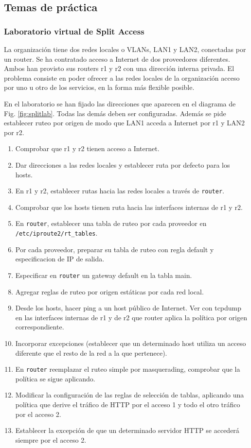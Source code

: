 \subsection{Temas de práctica}
\subsubsection{Laboratorio virtual de Split Access}
La organización tiene dos redes locales o VLANs, LAN1 y LAN2, conectadas por un router. Se ha contratado acceso a Internet de dos proveedores diferentes. Ambos han provisto sus routers r1 y r2 con una dirección interna privada. El problema consiste en poder ofrecer a las redes locales de la organización acceso por uno u otro de los servicios, en la forma más flexible posible. 


En el laboratorio se han fijado las direcciones que aparecen en el diagrama de Fig. \ref{fig:splitlab}. Todas las demás deben ser configuradas. Además se pide establecer ruteo por origen de modo que LAN1 acceda a Internet por r1 y LAN2 por r2.
\begin{enumerate}
	\item Comprobar que r1 y r2 tienen acceso a Internet. 
	\item Dar direcciones a las redes locales y establecer ruta por defecto para los hosts. 
	\item En r1 y r2, establecer rutas hacia las redes locales a través de \texttt{router}. 
	\item Comprobar que los hosts tienen ruta hacia las interfaces internas de r1 y r2. 
	\item En \texttt{router}, establecer una tabla de ruteo por cada proveedor en \texttt{/etc/iproute2/rt\_tables}. 
	\item Por cada proveedor, preparar su tabla de ruteo con regla default y especificacion de IP de salida. 
	\item Especificar en \texttt{router} un gateway default en la tabla main. 
	\item Agregar reglas de ruteo por origen estáticas por cada red local. 
	\item Desde los hosts, hacer ping a un host público de Internet. Ver con tcpdump en las interfaces internas de r1 y de r2 que router  aplica la política por origen correspondiente. 
	\item Incorporar excepciones (establecer que un determinado host utiliza un acceso diferente que el resto de la red a la que pertenece).
	\item En \texttt{router} reemplazar el ruteo simple por masquerading, comprobar que la política se sigue aplicando. 
	\item Modificar la configuración de las reglas de selección de tablas, aplicando una política que derive el tráfico de HTTP por el acceso 1 y todo el otro tráfico por el acceso 2.
	\item Establecer la excepción de que un determinado servidor HTTP se accederá siempre por el acceso 2. 
\end{enumerate}

